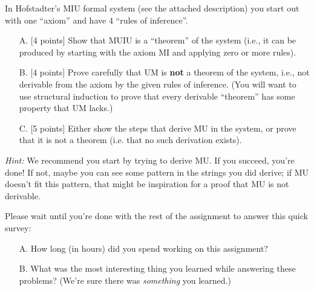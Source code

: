 \documentclass[12pt,letterpaper,boxed,cm]{hmcpset}
\begin{document}
\begin{solution}
    \vfill
\end{solution}
\newpage

\begin{problem}[3]
    [13 points] In Hofstadter’s MIU formal system (see the attached description) you start out with one “axiom” and have 4 “rules of inference”.
    \begin{enumerate}
        \item [A.] [4 points] Show that MUIU is a “theorem” of the system (i.e., it can be produced by starting with the axiom MI and applying zero or more rules).
        \item [B.] [4 points] Prove carefully that UM is \textbf{not} a theorem of the system, i.e., not derivable from the axiom by the given rules of inference. (You will want to use structural induction to prove that every derivable “theorem” has some property that UM lacks.)
        \item [C.][5 points] Either show the steps that derive MU in the system, or prove that it is not a theorem (i.e. that no such derivation exists). 
    \end{enumerate}
    \textit{Hint:} We recommend you start by trying to derive MU. If you succeed, you’re done! If not, maybe you can see some pattern in the strings you did derive; if MU doesn’t fit this pattern, that might be inspiration for a proof that MU is not derivable.
\end{problem}

\begin{solution}
    \vfill
\end{solution}
\newpage

\begin{problem} Please wait until you’re done with the rest of the assignment to answer this quick survey:
    \begin{enumerate}
        \item [A.] How long (in hours) did you spend working on this assignment?
        \item [B.] What was the most interesting thing you learned while answering these problems? (We’re sure there was \textit{something} you learned.)
    \end{enumerate}
\end{problem}

\begin{solution}
    \vfill
\end{solution}

\end{document}
